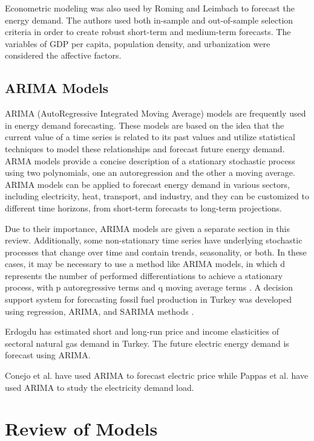 \documentclass[lettersize,journal]{IEEEtran}
\begin{document}
  Econometric modeling was also used by Roming and Leimbach \cite{Roming} to forecast the energy demand. The authors used both in-sample and out-of-sample selection criteria in order to create robust short-term and medium-term forecasts. The variables of GDP per capita, population density, and urbanization were considered the affective factors.
  


  \subsection{ARIMA Models}
  ARIMA (AutoRegressive Integrated Moving Average) models are frequently used in energy demand forecasting. These models are based on the idea that the current value of a time series is related to its past values and utilize statistical techniques to model these relationships and forecast future energy demand. ARMA models provide a concise description of a stationary stochastic process using two polynomials, one an autoregression and the other a moving average. ARIMA models can be applied to forecast energy demand in various sectors, including electricity, heat, transport, and industry, and they can be customized to different time horizons, from short-term forecasts to long-term projections.

  Due to their importance, ARIMA models are given a separate section in this review. Additionally, some non-stationary time series have underlying stochastic processes that change over time and contain trends, seasonality, or both. In these cases, it may be necessary to use a method like ARIMA models, in which d represents the number of performed differentiations to achieve a stationary process, with p autoregressive terms and q moving average terms \cite{Box}. A decision support system for forecasting fossil fuel production in Turkey was developed using regression, ARIMA, and SARIMA methods \cite{Ediger 1, Ediger 2}.
 
  Erdogdu \cite{Erdogdu} has estimated short and long-run price and income elasticities of sectoral natural gas demand in Turkey. The future electric energy demand is forecast using ARIMA. 
  

  Conejo et al. \cite{Conejo} have used ARIMA to forecast electric price while Pappas et al. \cite{Pappas} have used ARIMA to study the electricity demand load.
 

\section{Review of Models}
\end{document}
